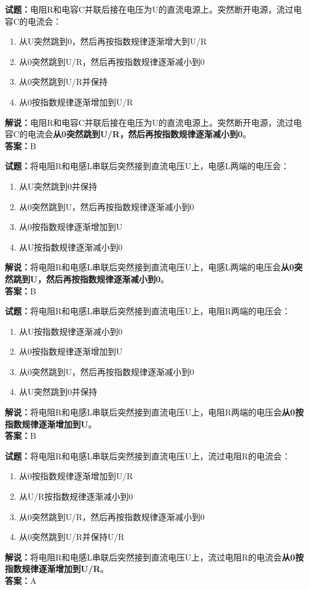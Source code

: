\documentclass{ctexbook}
\begin{document}
\noindent\textbf{试题：}电阻R和电容C并联后接在电压为U的直流电源上。突然断开电源，流过电容C的电流会：
\begin{enumerate}[leftmargin=3em]
\item 从U突然跳到0，然后再按指数规律逐渐增大到U/R
\item 从0突然跳到U/R，然后再按指数规律逐渐减小到0
\item 从0突然跳到U/R并保持
\item 从0按指数规律逐渐增加到U/R
\end{enumerate}
\noindent\textbf{解说：}电阻R和电容C并联后接在电压为U的直流电源上。突然断开电源，流过电容C的电流会\textbf{从0突然跳到U/R，然后再按指数规律逐渐减小到0}。\\\noindent\textbf{答案：}B



\bigskip


\noindent\textbf{试题：}将电阻R和电感L串联后突然接到直流电压U上，电感L两端的电压会：
\begin{enumerate}[leftmargin=3em]
\item 从U突然跳到0并保持
\item 从0突然跳到U，然后再按指数规律逐渐减小到0
\item 从0按指数规律逐渐增加到U
\item 从U按指数规律逐渐减小到0
\end{enumerate}
\noindent\textbf{解说：}将电阻R和电感L串联后突然接到直流电压U上，电感L两端的电压会\textbf{从0突然跳到U，然后再按指数规律逐渐减小到0}。\\\noindent\textbf{答案：}B



\bigskip


\noindent\textbf{试题：}将电阻R和电感L串联后突然接到直流电压U上，电阻R两端的电压会：
\begin{enumerate}[leftmargin=3em]
\item 从U按指数规律逐渐减小到0
\item 从0按指数规律逐渐增加到U
\item 从0突然跳到U，然后再按指数规律逐渐减小到0
\item 从U突然跳到0并保持
\end{enumerate}
\noindent\textbf{解说：}将电阻R和电感L串联后突然接到直流电压U上，电阻R两端的电压会\textbf{从0按指数规律逐渐增加到U}。\\\noindent\textbf{答案：}B




\bigskip


\noindent\textbf{试题：}将电阻R和电感L串联后突然接到直流电压U上，流过电阻R的电流会：
\begin{enumerate}[leftmargin=3em]
\item 从0按指数规律逐渐增加到U/R
\item 从U/R按指数规律逐渐减小到0
\item 从0突然跳到U/R，然后再按指数规律逐渐减小到0
\item 从0突然跳到U/R并保持U/R
\end{enumerate}
\noindent\textbf{解说：}将电阻R和电感L串联后突然接到直流电压U上，流过电阻R的电流会\textbf{从0按指数规律逐渐增加到U/R}。\\\noindent\textbf{答案：}A
\end{document}

